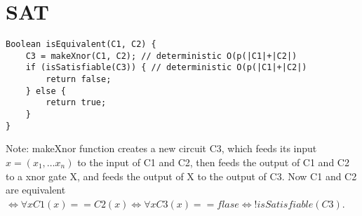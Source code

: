 \documentclass{article}
\begin{document}
\section{SAT}
\begin{lstlisting}
Boolean isEquivalent(C1, C2) {
	C3 = makeXnor(C1, C2); // deterministic O(p(|C1|+|C2|)
	if (isSatisfiable(C3)) { // deterministic O(p(|C1|+|C2|)
		return false;
	} else {
		return true;
	}
}
\end{lstlisting}
Note: makeXnor function creates a new circuit C3, which feeds its input $x = (x_1,
\ldots x_n)$ to the input of C1 and C2, then feeds the output of C1 and C2 to a
xnor gate X, and feeds the output of X to the output of C3. Now C1 and
C2 are equivalent $\iff \forall x C1(x) == C2(x) \iff \forall x C3(x) == flase
\iff !isSatisfiable(C3)$.
\end{document}
